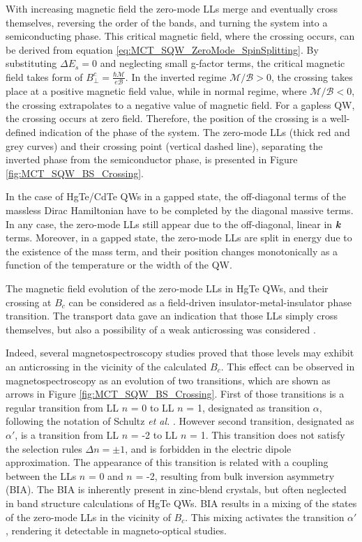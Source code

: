 \documentclass[titlepage,a4paper]{book}
\begin{document}
With increasing magnetic field the zero-mode LLs merge and eventually cross themselves, reversing the order of the bands, and turning the system into a semiconducting phase. This critical magnetic field, where the crossing occurs, can be derived from equation \ref{eq:MCT_SQW_ZeroMode_SpinSplitting}. By substituting $\Delta E_s = 0$ and neglecting small g-factor terms, the critical magnetic field takes form of $B^c_{\perp} = \frac{\hbar \mathcal{M}}{e\mathcal{B}}$. In the inverted regime $\mathcal{M}/\mathcal{B} > 0$, the crossing takes place at a positive magnetic field value, while in normal regime, where $\mathcal{M}/\mathcal{B} < 0$, the crossing extrapolates to a negative value of magnetic field. For a gapless QW, the crossing occurs at zero field. Therefore, the position of the crossing is a well-defined indication of the phase of the system. The zero-mode LLs (thick red and grey curves) and their crossing point (vertical dashed line), separating the inverted phase from the semiconductor phase, is presented in Figure \ref{fig:MCT_SQW_BS_Crossing}. 

In the case of HgTe/CdTe QWs in a gapped state, the off-diagonal terms of the massless Dirac Hamiltonian have to be completed by the diagonal massive terms. In any case, the zero-mode LLs still appear due to the off-diagonal, linear in \textbf{\textit{k}} terms. Moreover, in a gapped state, the zero-mode LLs are split in energy due to the existence of the mass term, and their position changes monotonically as a function of the temperature or the width of the QW.

The magnetic field evolution of the zero-mode LLs in HgTe QWs, and their crossing at $B_c$ can be considered as a field-driven insulator-metal-insulator phase transition. The transport data \cite{Konig_Topology} gave an indication that those LLs simply cross themselves, but also a possibility of a weak anticrossing was considered \cite{Konig_MCT_SQW}.

Indeed, several magnetospectroscopy studies \cite{Orlita_MCT_QW}\cite{Zholudev_MCT_QW} proved that those levels may exhibit an anticrossing in the vicinity of the calculated $B_c$. This effect can be observed in magnetospectroscopy as an evolution of two transitions, which are shown as arrows in Figure \ref{fig:MCT_SQW_BS_Crossing}. First of those transitions is a regular transition from LL $n$ = 0 to LL $n$ = 1, designated as transition $\alpha$, following the notation of Schultz \textit{et al.} \cite{Schultz}. However second transition, designated as $\alpha'$, is a transition from LL $n$ = -2 to LL $n$ = 1. This transition does not satisfy the selection rules $\Delta n = \pm 1$, and is forbidden in the electric dipole approximation. The appearance of this transition is related with a coupling between the LLs $n$ = 0 and $n$ = -2, resulting from bulk inversion asymmetry (BIA). The BIA is inherently present in zinc-blend crystals, but often neglected in band structure calculations of HgTe QWs. BIA results in a mixing of the states of the zero-mode LLs in the vicinity of $B_c$. This mixing activates the transition $\alpha'$, rendering it detectable in magneto-optical studies.
\end{document}
